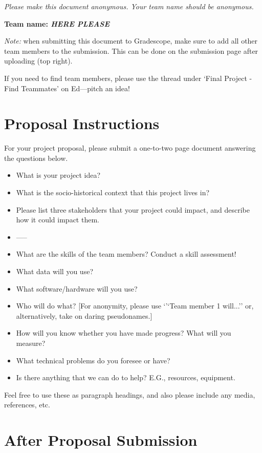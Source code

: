 \emph{Please make this document anonymous. Your team name should be anonymous.}

\textbf{Team name: \emph{HERE PLEASE}}

\emph{Note:} when submitting this document to Gradescope, make sure to add all other team members to the submission. This can be done on the submission page after uploading (top right).

If you need to find team members, please use the thread under `Final Project - Find Teammates' on Ed---pitch an idea!

\section*{Proposal Instructions}

For your project proposal, please submit a one-to-two page document answering the questions below.

\begin{itemize}
  \item What is your project idea?  
  \item What is the socio-historical context that this project lives in? 
  \item Please list three stakeholders that your project could impact, and describe how it could impact them.
  \item -----
  \item What are the skills of the team members? Conduct a skill assessment!
  \item What data will you use?
  \item What software/hardware will you use?
  \item Who will do what? [For anonymity, please use `'`Team member 1 will...'' or, alternatively, take on daring pseudonames.]
  \item How will you know whether you have made progress? What will you measure?
  \item What technical problems do you foresee or have?
  \item Is there anything that we can do to help? E.G., resources, equipment.
\end{itemize}

Feel free to use these as paragraph headings, and also please include any media, references, etc.

\section*{After Proposal Submission}

